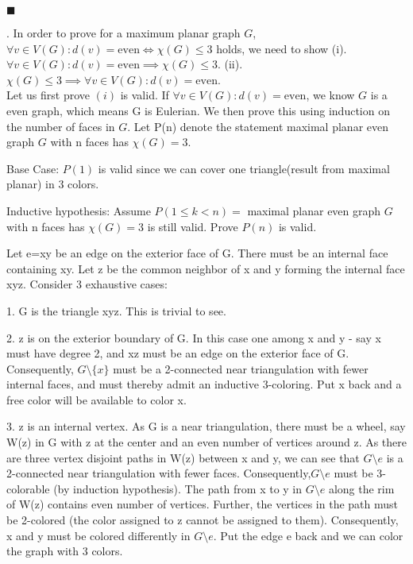 \documentclass[12pt]{article}
\begin{document}
	\hfill $\blacksquare$
	
	. In order to prove for a maximum planar graph $G$, $\forall v \in V(G) : d(v) = \text{even} \iff \chi(G) \leq 3$ holds, we need to show (i). $\forall v \in V(G) : d(v) = \text{even} \implies \chi(G) \leq 3$. (ii). $ \chi(G) \leq 3 \implies \forall v \in V(G) : d(v) = \text{even}$.\\
	
	Let us first prove $(i)$ is valid. If $\forall v \in V(G) : d(v) = \text{even}$, we know $G$ is a even graph, which means G is Eulerian. We then prove this using induction on the number of faces in $G$. Let P(n) denote the statement maximal planar even graph $G$ with n faces has $\chi(G) = 3$. 
	
	Base Case: $P(1)$ is valid since we can cover one triangle(result from maximal planar) in 3 colors.
	
	Inductive hypothesis: Assume $P(1 \leq k < n) = $ maximal planar even graph $G$ with n faces has $\chi(G) = 3$ is still valid. Prove $P(n)$ is valid.
	
	Let e=xy be an edge on the exterior face of G. There must be an internal face containing xy. Let z be the common neighbor of x and y forming the internal face xyz. Consider 3 exhaustive cases:
	
	1. G is the triangle xyz. This is trivial to see.
	
	2. z is on the exterior boundary of G. In this case one among x and y - say x must have degree 2, and xz must be an edge on the exterior face of G. Consequently, $G \setminus \{x\}$ must be a 2-connected near triangulation with fewer internal faces, and must thereby admit an inductive 3-coloring. Put x back and a free color will be available to color x.
	
	3. z is an internal vertex. As G is a near triangulation, there must be a wheel, say W(z) in G with z at the center and an even number of vertices around z. As there are three vertex disjoint paths in W(z) between x and y, we can see that $G \setminus e$ is a 2-connected near triangulation with fewer faces. Consequently,$G \setminus e$ must be 3-colorable (by induction hypothesis). The path from x to y in $G \setminus e$ along the rim of W(z) contains even number of vertices. Further, the vertices in the path must be 2-colored (the color assigned to z cannot be assigned to them). Consequently, x and y must be colored differently in $G \setminus e$. Put the edge e back and we can color the graph with 3 colors.
\end{document}
